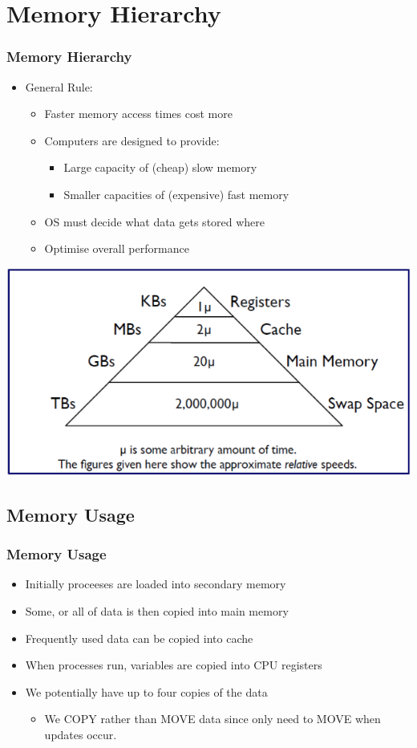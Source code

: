 \documentclass{beamer}
\begin{document}
\section{Memory Hierarchy}
\begin{frame}
\frametitle{Memory Hierarchy}
\begin{itemize}
\item General Rule:
\begin{itemize}
\item Faster memory access times cost more
\item Computers are designed to provide:
\begin{itemize}
\item Large capacity of (cheap) slow memory
\item Smaller capacities of (expensive) fast memory
\end{itemize}
\item OS must decide what data gets stored where
\item Optimise overall performance
\end{itemize}
\end{itemize}
\includegraphics[scale=0.35]{hier.png}
\end{frame}
\subsection{Memory Usage}
\begin{frame}
\frametitle{Memory Usage}
\begin{itemize}
\item Initially proceeses are loaded into secondary memory
\item Some, or all of data is then copied into main memory
\item Frequently used data can be copied into cache
\item When processes run, variables are copied into CPU registers
\item We potentially have up to four copies of the data
\begin{itemize}
\item We COPY rather than MOVE data since only need to MOVE when updates occur.
\end{itemize}
\end{itemize}
\end{frame}
\end{document}
